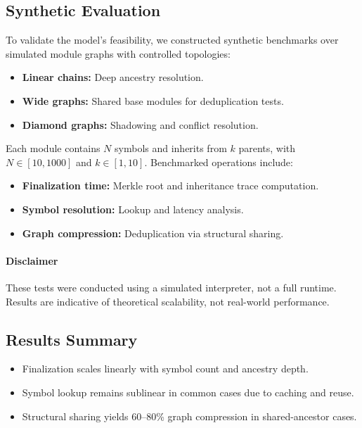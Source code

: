 \documentclass[sigplan,screen]{acmart}
\begin{document}
\subsection{Synthetic Evaluation}

To validate the model’s feasibility, we constructed synthetic benchmarks over simulated module graphs with controlled topologies:

\begin{itemize}
  \item \textbf{Linear chains:} Deep ancestry resolution.
  \item \textbf{Wide graphs:} Shared base modules for deduplication tests.
  \item \textbf{Diamond graphs:} Shadowing and conflict resolution.
\end{itemize}

Each module contains $N$ symbols and inherits from $k$ parents, with $N \in [10, 1000]$ and $k \in [1, 10]$. Benchmarked operations include:

\begin{itemize}
  \item \textbf{Finalization time:} Merkle root and inheritance trace computation.
  \item \textbf{Symbol resolution:} Lookup and latency analysis.
  \item \textbf{Graph compression:} Deduplication via structural sharing.
\end{itemize}

\paragraph{Disclaimer}
These tests were conducted using a simulated interpreter, not a full runtime. Results are indicative of theoretical scalability, not real-world performance.

\subsection{Results Summary}

\begin{itemize}
  \item Finalization scales linearly with symbol count and ancestry depth.
  \item Symbol lookup remains sublinear in common cases due to caching and reuse.
  \item Structural sharing yields 60--80\% graph compression in shared-ancestor cases.
\end{itemize}
\end{document}
